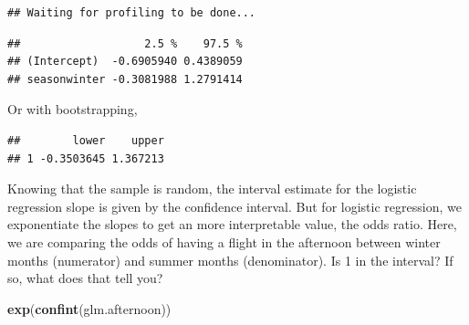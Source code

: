 \documentclass[
]{book}
\newenvironment{Shaded}{\begin{snugshade}}{\end{snugshade}}
\newcommand{\CommentTok}[1]{\textcolor[rgb]{0.56,0.35,0.01}{\textit{#1}}}
\newcommand{\DataTypeTok}[1]{\textcolor[rgb]{0.13,0.29,0.53}{#1}}
\newcommand{\DecValTok}[1]{\textcolor[rgb]{0.00,0.00,0.81}{#1}}
\newcommand{\KeywordTok}[1]{\textcolor[rgb]{0.13,0.29,0.53}{\textbf{#1}}}
\newcommand{\NormalTok}[1]{#1}
\newcommand{\OperatorTok}[1]{\textcolor[rgb]{0.81,0.36,0.00}{\textbf{#1}}}
\newcommand{\OtherTok}[1]{\textcolor[rgb]{0.56,0.35,0.01}{#1}}
\newcommand{\StringTok}[1]{\textcolor[rgb]{0.31,0.60,0.02}{#1}}
\begin{document}
\begin{verbatim}
## Waiting for profiling to be done...
\end{verbatim}

\begin{verbatim}
##                   2.5 %    97.5 %
## (Intercept)  -0.6905940 0.4389059
## seasonwinter -0.3081988 1.2791414
\end{verbatim}

Or with bootstrapping,

\begin{Shaded}
\end{Shaded}

\begin{verbatim}
##        lower    upper
## 1 -0.3503645 1.367213
\end{verbatim}

Knowing that the sample is random, the interval estimate for the logistic regression slope is given by the confidence interval. But for logistic regression, we exponentiate the slopes to get an more interpretable value, the odds ratio. Here, we are comparing the odds of having a flight in the afternoon between winter months (numerator) and summer months (denominator). Is 1 in the interval? If so, what does that tell you?

\begin{Shaded}
\begin{Highlighting}[]
\KeywordTok{exp}\NormalTok{(}\KeywordTok{confint}\NormalTok{(glm.afternoon))}
\end{Highlighting}
\end{Shaded}
\end{document}
